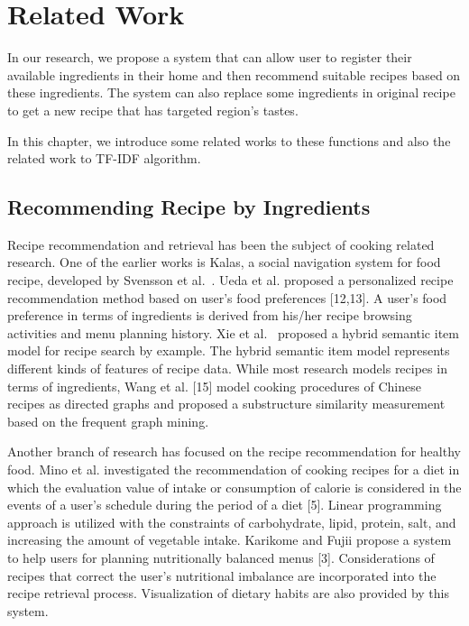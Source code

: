 \chapter{Related Work}\label{chap:related}

In our research, we propose a system that can allow user to register their available ingredients in their home and then recommend suitable recipes based on these ingredients. The system can also replace some ingredients in original recipe to get a new recipe that has targeted region's tastes. 

In this chapter, we introduce some related works to these functions and also the related work to TF-IDF algorithm. 

\clearpage

\section{Recommending Recipe by 
Ingredients}\label{sec:related_near}


Recipe recommendation and retrieval has been the subject of
cooking related research. One of the earlier works is Kalas, a social navigation system for food recipe, developed by Svensson et al.~\cite{Svensson:2005:DEK:1096737.1096739}. Ueda et al. proposed a personalized recipe recommendation method based on user’s food preferences [12,13]. A user’s food preference in terms of ingredients is derived from his/her recipe browsing activities and menu planning history. Xie et al.~\cite{5693849} proposed a hybrid semantic item model for recipe search by example. The hybrid semantic item model represents different kinds of features of recipe data. While most research models recipes in terms of ingredients, Wang et al. [15] model cooking procedures of Chinese recipes as directed graphs and proposed a substructure similarity measurement based on the frequent graph mining.


Another branch of research has focused on the recipe
recommendation for healthy food. Mino et al. investigated the recommendation of cooking recipes for a diet in which the evaluation value of intake or consumption of calorie is considered in the events of a user's schedule during the period of a diet [5]. Linear programming approach is utilized with the constraints of carbohydrate, lipid, protein, salt, and increasing the amount of vegetable intake. Karikome and Fujii propose a system to help
users for planning nutritionally balanced menus [3].
Considerations of recipes that correct the user’s nutritional imbalance are incorporated into
the recipe retrieval process.
Visualization of dietary habits are also provided by this system.

